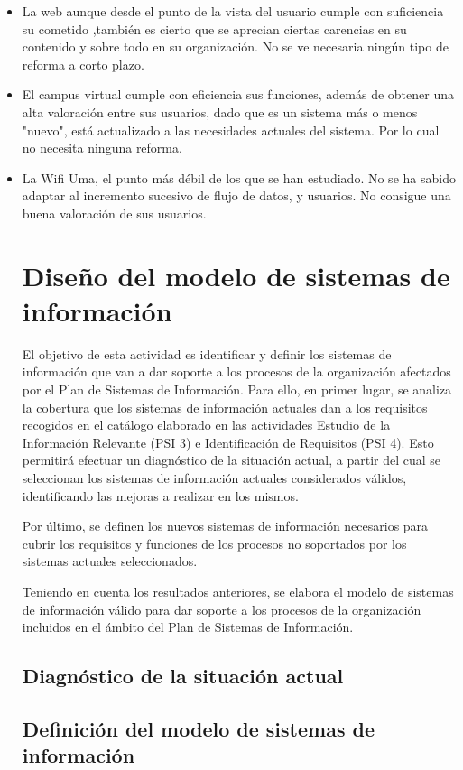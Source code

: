 \documentclass[11pt,a4paper,spanish,twoside]{book}
\begin{document}
\begin{itemize}
  \item La web aunque desde el punto de la vista del usuario cumple con 
suficiencia su cometido ,también es cierto que se aprecian ciertas carencias en 
su contenido y sobre todo en su organización. No se ve necesaria ningún tipo de 
reforma a corto plazo.
  \item El campus virtual cumple con eficiencia sus funciones, además de 
obtener una alta valoración entre sus usuarios, dado que es un sistema más o 
menos "nuevo", está actualizado a las necesidades actuales del sistema. Por lo 
cual no necesita ninguna reforma.
  \item La Wifi Uma, el punto más débil de los que se han estudiado. No se ha 
sabido adaptar al incremento sucesivo de flujo de datos, y usuarios. No 
consigue una buena valoración de sus usuarios. 
\chapter{Diseño del modelo de sistemas de información}
El objetivo de esta actividad es identificar y definir los sistemas de
información que van a dar soporte a los procesos de la organización afectados
por el Plan de Sistemas de Información. Para ello, en primer lugar, se
analiza la cobertura que los sistemas de información actuales dan a los
requisitos recogidos en el catálogo elaborado en las actividades Estudio de
la Información Relevante (PSI 3) e Identificación de Requisitos (PSI 4). Esto
permitirá efectuar un diagnóstico de la situación actual, a partir del cual
se seleccionan los sistemas de información actuales considerados válidos,
identificando las mejoras a realizar en los mismos. 

Por último, se definen los nuevos sistemas de información necesarios para
cubrir los requisitos y funciones de los procesos no soportados por los
sistemas actuales seleccionados. 

Teniendo en cuenta los resultados anteriores, se elabora el modelo de
sistemas de información válido para dar soporte a los procesos de la
organización incluidos en el ámbito del Plan de Sistemas de Información. 

\section{Diagnóstico de la situación actual}

\section{Definición del modelo de sistemas de información}



\end{itemize}
\end{document}
